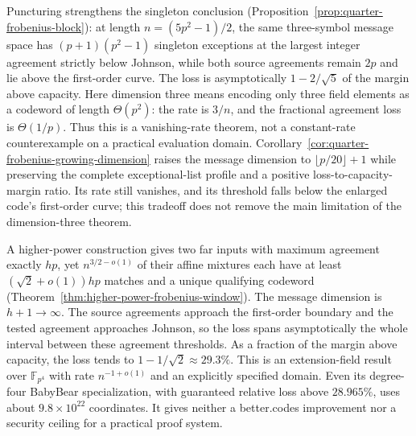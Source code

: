 \documentclass[11pt,letterpaper]{article}
\theoremstyle{definition}
\theoremstyle{remark}
\newcommand{\F}{\mathbb F}
\begin{document}
Puncturing strengthens the singleton conclusion
(Proposition~\ref{prop:quarter-frobenius-block}): at length
$n=(5p^2-1)/2$, the same three-symbol message space has
$(p+1)(p^2-1)$ singleton exceptions at the largest integer agreement
strictly below Johnson, while both source agreements remain $2p$ and
lie above the first-order curve. The loss is asymptotically
$1-2/\sqrt5$ of the margin above capacity.
Here dimension three means encoding only three field elements as a
codeword of length $\Theta(p^2)$: the rate is $3/n$, and the fractional
agreement loss is $\Theta(1/p)$. Thus this is a vanishing-rate theorem,
not a constant-rate counterexample on a practical evaluation domain.
Corollary~\ref{cor:quarter-frobenius-growing-dimension} raises the message
dimension to $\lfloor p/20\rfloor+1$ while preserving the complete
exceptional-list profile and a positive loss-to-capacity-margin ratio.
Its rate still vanishes, and its threshold falls below the enlarged
code's first-order curve; this tradeoff does not remove the main
limitation of the dimension-three theorem.

A higher-power construction gives two far inputs with maximum agreement
exactly $hp$, yet $n^{3/2-o(1)}$ of their affine mixtures each have
at least $(\sqrt2+o(1))hp$ matches and a unique qualifying codeword
(Theorem~\ref{thm:higher-power-frobenius-window}). The message dimension
is $h+1\to\infty$. The source agreements approach the first-order
boundary and the tested agreement approaches Johnson, so the loss spans
asymptotically the whole interval between these agreement thresholds.
As a fraction of the margin above capacity, the loss tends to
$1-1/\sqrt2\approx29.3\%$.
This is an extension-field result over $\F_{p^4}$ with rate
$n^{-1+o(1)}$ and an explicitly specified domain. Even its degree-four BabyBear
specialization, with guaranteed relative loss above $28.965\%$, uses
about $9.8\times10^{22}$ coordinates. It gives neither a better.codes
improvement nor a security ceiling for a practical proof system.
\end{document}
